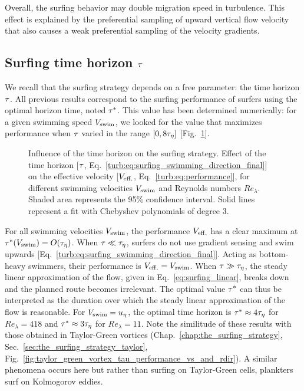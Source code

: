 Overall, the surfing behavior may double migration speed in turbulence. 
This effect is explained by the preferential sampling of upward vertical flow velocity that also causes a weak preferential sampling of the velocity gradients.

\subsection{Surfing time horizon $\tau$}\label{sec:surfing_time_horizon}

We recall that the surfing strategy depends on a free parameter: the time horizon $\tau$.
All previous results correspond to the surfing performance of surfers using the optimal horizon time, noted $\tau^*$.
This value has been determined numerically: for a given swimming speed $V_{\mathrm{swim}}$, we looked for the value that maximizes performance when $\tau$ varied in the range $[0, 8\tau_{\eta}]$ [Fig.~\ref{fig:surfing_parameter_tau_vs}].
\begin{figure}%
	\centering
	
	\caption[Influence of the time horizon on the surfing strategy.]{
		Influence of the time horizon on the surfing strategy.
		Effect of the time horizon [$\tau$, Eq.~\eqref{turb:eq:surfing_swimming_direction_final}] on the effective velocity [$V_{\mathrm{eff.}}$, Eq.~\eqref{turb:eq:performance}], for different swimming velocities $V_{\mathrm{swim}}$ and Reynolds numbers $\mathit{Re}_{\lambda}$.
		Shaded area represents the 95\% confidence interval.
		Solid lines represent a fit with Chebyshev polynomials of degree 3.
	}
	\label{fig:surfing_parameter_tau_vs}
\end{figure}
For all swimming velocities $V_{\mathrm{swim}}$, the performance $V_{\mathrm{eff.}}$ has a clear maximum at $\tau^*(V_{\mathrm{swim}}) = O(\tau_{\eta})$.
When $\tau \ll \tau_{\eta}$, surfers do not use gradient sensing and swim upwards [Eq.~\eqref{turb:eq:surfing_swimming_direction_final}].
Acting as bottom-heavy swimmers, their performance is $V_{\mathrm{eff.}} = V_{\mathrm{swim}}$.
When $\tau \gg \tau_{\eta}$, the steady linear approximation of the flow, given in Eq.~\eqref{eq:surfing_linear}, breaks down and the planned route becomes irrelevant.
The optimal value $\tau^*$ can thus be interpreted as the duration over which the steady linear approximation of the flow is reasonable.
For $V_{\mathrm{swim}} = u_{\eta}$, the optimal time horizon is $\tau^* \approx 4 \tau_{\eta}$ for $\mathit{Re}_{\lambda} = 418$ and $\tau^* \approx 3 \tau_{\eta}$ for $\mathit{Re}_{\lambda} = 11$.
Note the similitude of these results with those obtained in Taylor-Green vortices (Chap.~\ref{chap:the_surfing_strategy}, Sec.~\ref{sec:the_surfing_strategy_taylor}, Fig.~\ref{fig:taylor_green_vortex_tau_performance_vs_and_rdir}).
A similar phenomena occurs here but rather than surfing on Taylor-Green cells, plankters surf on Kolmogorov eddies.

